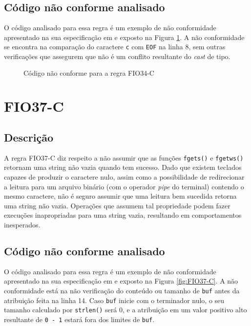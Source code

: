 \subsection{Código não conforme analisado}

O código analisado para essa regra é um exemplo de não conformidade apresentado na sua especificação em \cite{ccert} e exposto na Figura \ref{fig:FIO34-C}. A não conformidade se encontra na comparação do caractere \texttt{c} com \texttt{EOF} na linha 8, sem outras verificações que assegurem que não é um conflito resultante do \textit{cast} de tipo.

\begin{figure}[h!]
  \centering
  
  \caption{Código não conforme para a regra FIO34-C}
\label{fig:FIO34-C}
\end{figure}

\section{FIO37-C}
\subsection{Descrição}

A regra FIO37-C diz respeito a não assumir que as funções \texttt{fgets()} e \texttt{fgetws()} retornam uma string não vazia quando tem sucesso. Dado que existem teclados capazes de produzir o caractere nulo, assim como a possibilidade de redirecionar a leitura para um arquivo binário (com o operador \textit{pipe} do terminal) contendo o mesmo caractere, não é seguro assumir que uma leitura bem sucedida retorna uma string não vazia. Operações que assumem tal propriedade podem fazer execuções inapropriadas para uma string vazia, resultando em comportamentos inesperados.

\subsection{Código não conforme analisado}

O código analisado para essa regra é um exemplo de não conformidade apresentado na sua especificação em \cite{ccert} e exposto na Figura \ref{fig:FIO37-C}. A não conformidade está na não verificação do conteúdo ou tamanho de \texttt{buf} antes da atribuição feita na linha 14. Caso \texttt{buf} inicie com o terminador nulo, o seu tamanho calculado por \texttt{strlen()} será 0, e a atribuição em um valor positivo alto resultante de \texttt{0 - 1} estará fora dos limites de \texttt{buf}.

